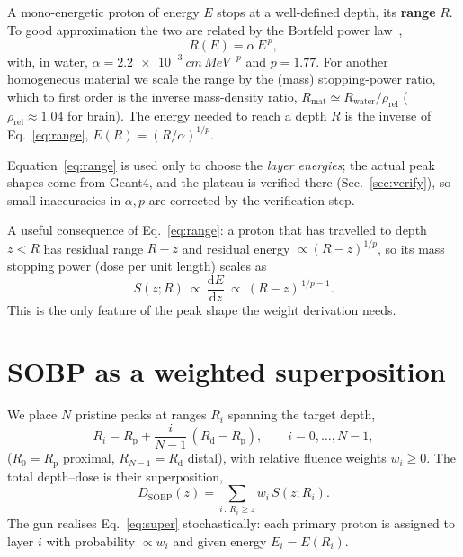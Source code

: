\documentclass[11pt]{article}
\newcommand{\Rd}{R_{\mathrm d}}
\newcommand{\Rp}{R_{\mathrm p}}
\begin{document}
A mono-energetic proton of energy $E$ stops at a well-defined depth, its
\textbf{range} $R$. To good approximation the two are related by the
Bortfeld power law~\cite{bortfeld1996},
\begin{equation}
R(E) = \alpha\,E^{\,p},
\label{eq:range}
\end{equation}
with, in water, $\alpha=\SI{2.2e-3}{cm\,MeV^{-p}}$ and $p=1.77$. For another
homogeneous material we scale the range by the (mass) stopping-power ratio,
which to first order is the inverse mass-density ratio,
$R_{\mathrm{mat}}\simeq R_{\mathrm{water}}/\rho_{\mathrm{rel}}$
($\rho_{\mathrm{rel}}\approx1.04$ for brain). The energy needed to reach a depth
$R$ is the inverse of Eq.~\eqref{eq:range}, $E(R)=(R/\alpha)^{1/p}$.

Equation~\eqref{eq:range} is used only to choose the \emph{layer energies}; the
actual peak shapes come from Geant4, and the plateau is verified there
(Sec.~\ref{sec:verify}), so small inaccuracies in $\alpha,p$ are corrected by
the verification step.

A useful consequence of Eq.~\eqref{eq:range}: a proton that has travelled to
depth $z<R$ has residual range $R-z$ and residual energy
$\propto (R-z)^{1/p}$, so its mass stopping power (dose per unit length) scales as
\begin{equation}
S(z;R)\ \propto\ \frac{\mathrm dE}{\mathrm dz}\ \propto\ (R-z)^{\,1/p-1}.
\label{eq:stop}
\end{equation}
This is the only feature of the peak shape the weight derivation needs.

\section{SOBP as a weighted superposition}

We place $N$ pristine peaks at ranges $R_i$ spanning the target depth,
\begin{equation}
R_i = \Rp + \frac{i}{N-1}\,(\Rd-\Rp),\qquad i=0,\dots,N-1,
\end{equation}
($R_0=\Rp$ proximal, $R_{N-1}=\Rd$ distal), with relative fluence weights
$w_i\ge0$. The total depth--dose is their superposition,
\begin{equation}
D_{\mathrm{SOBP}}(z)=\sum_{i\,:\,R_i\ge z} w_i\,S(z;R_i).
\label{eq:super}
\end{equation}
The gun realises Eq.~\eqref{eq:super} stochastically: each primary proton is
assigned to layer $i$ with probability $\propto w_i$ and given energy
$E_i=E(R_i)$.
\end{document}
